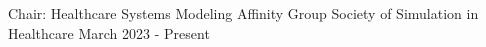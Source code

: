 


\begin{cventries}

  \cventry
    {Chair: Healthcare Systems Modeling Affinity Group } %
    {Society of Simulation in Healthcare} %
    {} %
    {March 2023 - Present} %
    {
    }

    
\end{cventries}
